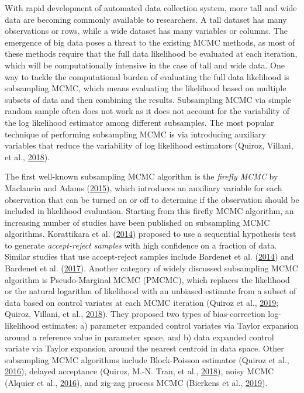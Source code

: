 \documentclass[12pt]{book}
\numberwithin{equation}{chapter}
\begin{document}
With rapid development of automated data collection system, more tall and wide data are becoming commonly available to researchers. A tall dataset has many observations or rows, while a wide dataset has many variables or columns. The emergence of big data poses a threat to the existing MCMC methods, as most of these methods require that the full data likelihood be evaluated at each iteration, which will be computationally intensive in the case of tall and wide data. One way to tackle the computational burden of evaluating the full data likelihood is subsampling MCMC, which means evaluating the likelihood based on multiple subsets of data and then combining the results. Subsampling MCMC via simple random sample often does not work as it does not account for the variability of the log likelihood estimator among different subsamples. The most popular technique of performing subsampling MCMC is via introducing auxiliary variables that reduce the variability of log likelihood estimators (Quiroz, Villani, et al., \protect\hyperlink{ref-quiroz2018subsampling}{2018}).

The first well-known subsampling MCMC algorithm is the \emph{firefly MCMC} by Maclaurin and Adams (\protect\hyperlink{ref-maclaurin2015firefly}{2015}), which introduces an auxiliary variable for each observation that can be turned on or off to determine if the observation should be included in likelihood evaluation. Starting from this firefly MCMC algorithm, an increasing number of studies have been published on subsampling MCMC algorithms. Korattikara et al. (\protect\hyperlink{ref-korattikara2014austerity}{2014}) proposed to use a sequential hypothesis test to generate \emph{accept-reject samples} with high confidence on a fraction of data. Similar studies that use accept-reject samples include Bardenet et al. (\protect\hyperlink{ref-bardenet2014towards}{2014}) and Bardenet et al. (\protect\hyperlink{ref-bardenet2017markov}{2017}). Another category of widely discussed subsampling MCMC algorithm is Pseudo-Marginal MCMC (PMCMC), which replaces the likelihood or the natural logarithm of likelihood with an unbiased estimate from a subset of data based on control variates at each MCMC iteration (Quiroz et al., \protect\hyperlink{ref-quiroz2019speeding}{2019}; Quiroz, Villani, et al., \protect\hyperlink{ref-quiroz2018subsampling}{2018}). They proposed two types of bias-correction log-likelihood estimates: a) parameter expanded control variates via Taylor expansion around a reference value in parameter space, and b) data expanded control variate via Taylor expansion around the nearest centroid in data space. Other subsampling MCMC algorithms include Block-Poisson estimator (Quiroz et al., \protect\hyperlink{ref-quiroz2016block}{2016}), delayed acceptance (Quiroz, M.-N. Tran, et al., \protect\hyperlink{ref-quiroz2018speeding}{2018}), noisy MCMC (Alquier et al., \protect\hyperlink{ref-alquier2016noisy}{2016}), and zig-zag process MCMC (Bierkens et al., \protect\hyperlink{ref-bierkens2019zig}{2019}).
\end{document}
